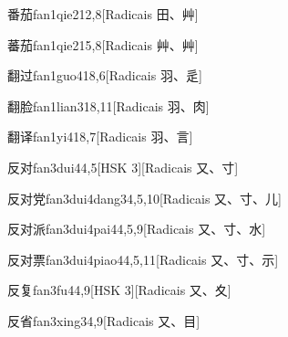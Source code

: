 \begin{entry}{番茄}{fan1qie2}{12,8}[Radicais ⽥、⾋]
\end{entry}

\begin{entry}{蕃茄}{fan1qie2}{15,8}[Radicais ⾋、⾋]
\end{entry}

\begin{entry}{翻过}{fan1guo4}{18,6}[Radicais ⽻、⾡]
\end{entry}

\begin{entry}{翻脸}{fan1lian3}{18,11}[Radicais ⽻、⾁]
\end{entry}

\begin{entry}{翻译}{fan1yi4}{18,7}[Radicais ⽻、⾔]
\end{entry}

\begin{entry}{反对}{fan3dui4}{4,5}[HSK 3][Radicais ⼜、⼨]
\end{entry}

\begin{entry}{反对党}{fan3dui4dang3}{4,5,10}[Radicais ⼜、⼨、⼉]
\end{entry}

\begin{entry}{反对派}{fan3dui4pai4}{4,5,9}[Radicais ⼜、⼨、⽔]
\end{entry}

\begin{entry}{反对票}{fan3dui4piao4}{4,5,11}[Radicais ⼜、⼨、⽰]
\end{entry}

\begin{entry}{反复}{fan3fu4}{4,9}[HSK 3][Radicais ⼜、⼢]
\end{entry}

\begin{entry}{反省}{fan3xing3}{4,9}[Radicais ⼜、⽬]
\end{entry}

